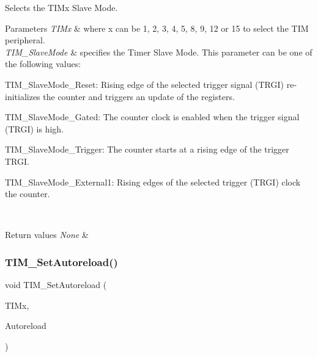 Selects the T\+I\+Mx Slave Mode. 


\begin{DoxyParams}{Parameters}
{\em T\+I\+Mx} & where x can be 1, 2, 3, 4, 5, 8, 9, 12 or 15 to select the T\+IM peripheral. \\
\hline
{\em T\+I\+M\+\_\+\+Slave\+Mode} & specifies the Timer Slave Mode. This parameter can be one of the following values\+: \begin{DoxyItemize}
\item T\+I\+M\+\_\+\+Slave\+Mode\+\_\+\+Reset\+: Rising edge of the selected trigger signal (T\+R\+GI) re-\/initializes the counter and triggers an update of the registers. \item T\+I\+M\+\_\+\+Slave\+Mode\+\_\+\+Gated\+: The counter clock is enabled when the trigger signal (T\+R\+GI) is high. \item T\+I\+M\+\_\+\+Slave\+Mode\+\_\+\+Trigger\+: The counter starts at a rising edge of the trigger T\+R\+GI. \item T\+I\+M\+\_\+\+Slave\+Mode\+\_\+\+External1\+: Rising edges of the selected trigger (T\+R\+GI) clock the counter. \end{DoxyItemize}
\\
\hline
\end{DoxyParams}

\begin{DoxyRetVals}{Return values}
{\em None} & \\
\hline
\end{DoxyRetVals}
\mbox{\label{group___t_i_m___private___functions_ga7880e4c00002d6421f9059a2ed841d5c}} 
\subsubsection{\texorpdfstring{TIM\_SetAutoreload()}{TIM\_SetAutoreload()}}
{\footnotesize\ttfamily void T\+I\+M\+\_\+\+Set\+Autoreload (\begin{DoxyParamCaption}\item[{\mbox{\hyperlink{struct_t_i_m___type_def}{T\+I\+M\+\_\+\+Type\+Def}} $\ast$}]{T\+I\+Mx,  }\item[{uint16\+\_\+t}]{Autoreload }\end{DoxyParamCaption})}



